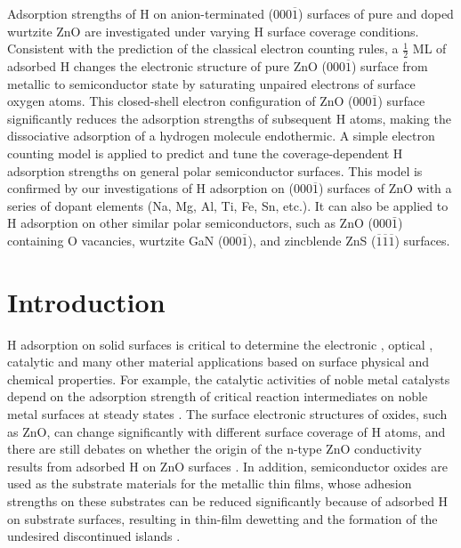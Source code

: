 Adsorption strengths of H on anion-terminated (000$\overline{1}$) surfaces of pure and doped wurtzite ZnO are investigated under varying H surface coverage conditions. Consistent with the prediction of the classical electron counting rules, a $\frac{1}{2}$ \ac{ML} of adsorbed H changes the electronic structure of pure ZnO (000$\overline{1}$) surface from metallic to semiconductor state by saturating unpaired electrons of surface oxygen atoms. This closed-shell electron configuration of ZnO (000$\overline{1}$) surface significantly reduces the adsorption strengths of subsequent H atoms, making the dissociative adsorption of a hydrogen molecule endothermic. A simple electron counting model is applied to predict and tune the coverage-dependent H adsorption strengths on general polar semiconductor surfaces. This model is confirmed by our investigations of H adsorption on (000$\overline{1}$) surfaces of ZnO with a series of dopant elements (Na, Mg, Al, Ti, Fe, Sn, etc.). It can also be applied to H adsorption on other similar polar semiconductors, such as ZnO (000$\bar{1}$) containing O vacancies, wurtzite GaN  (000$\overline{1}$), and zincblende ZnS ($\overline{1}$$\overline{1}$$\overline{1}$) surfaces.

\section{Introduction}

H adsorption on solid surfaces is critical to determine the electronic \cite{pearton2010recent,friend1987electronic}, optical \cite{lee2003electrical,major1986effect}, catalytic \cite{xie2011control,haruta1989gold,levy1973platinum} and many other material applications based on surface physical and chemical properties. For example, the catalytic activities of noble metal catalysts depend on the adsorption strength of critical reaction intermediates on noble metal surfaces at steady states \cite{qi2012adsorbate}. The surface electronic structures of oxides, such as ZnO, can change significantly with different surface coverage of H atoms, and there are still debates on whether the origin of the n-type ZnO conductivity results from adsorbed H on ZnO surfaces \cite{janotti2009fundamentals}. In addition, semiconductor oxides are used as the substrate materials for the metallic thin films, whose adhesion strengths on these substrates can be reduced significantly because of adsorbed H on substrate surfaces, resulting in thin-film dewetting and the formation of the undesired discontinued islands \cite{lin2007density,duriau2006growth}.

